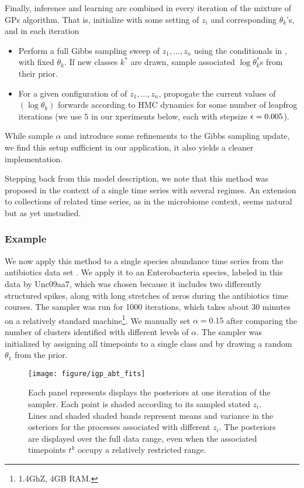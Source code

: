 \documentclass{article}
\begin{document}
Finally, inference and learning are combined in every iteration of the mixture
of GPs algorithm. That is, initialize with some setting of $z_i$ and
corresponding $\theta_k$'s, and in each iteration
\begin{itemize}
\item Perform a full Gibbs sampling sweep of $z_1, \dots, z_n$ using the
  conditionals in \label{eq:igp_conditional}, with fixed $\theta_k$. If new
  classes $k^\ast$ are drawn, sample associated $\log \theta_k^\ast$s from their
  prior.
\item For a given configuration of of $z_1, \dots, z_n$, propogate the current
  values of $\left(\log \theta_k\right)$ forwards according to HMC dynamics for
  some number of leapfrog iterations (we use $5$ in our xperiments below, each
  with stepsize $\epsilon = 0.005$).
\end{itemize}

While \citep{rasmussen2006gaussian} sample $\alpha$ and introduce some refinements to
the Gibbs sampling update, we find this setup sufficient in our application, it
also yields a cleaner implementation.

Stepping back from this model description, we note that this method was
proposed in the context of a single time series with several regimes. An
extension to collections of related time series, as in the microbiome context,
seems natural but as yet unstudied.

\subsubsection{Example}
\label{subsubsec:igp_mix_example}

We now apply this method to a single species abundance time series from the
antibiotics data set \citep{dethlefsen2011incomplete}. We apply it to an
Enterobacteria species, labeled in this data by Unc09aa7, which was chosen
because it includes two differently structured spikes, along with long stretches
of zeros during the antibiotics time courses. The sampler was run for 1000
iterations, which takes about 30 minutes on a relatively standard
machine\footnote{1.4GhZ, 4GB RAM.}. We manually set $\alpha = 0.15$ after
comparing the number of clusters identified with different levels of $\alpha$.
The sampler was initialized by assigning all timepoints to a single class and by
drawing a random $\theta_1$ from the prior.

\begin{figure}[ht]
  \centering
  \texttt{[image: figure/igp\_abt\_fits]}
  \caption{Each panel represents displays the posteriors at one iteration of the
    sampler. Each point is shaded according to its sampled stated $z_i$. Lines
    and shaded shaded bands represent means and variance in the osteriors for
    the processes associated with different $z_i$. The posteriors are displayed
    over the full data range, even when the associated timepoints $t^k$ occupy a
    relatively restricted range. \label{fig:igp_abt_fits}}
\end{figure}
\end{document}
